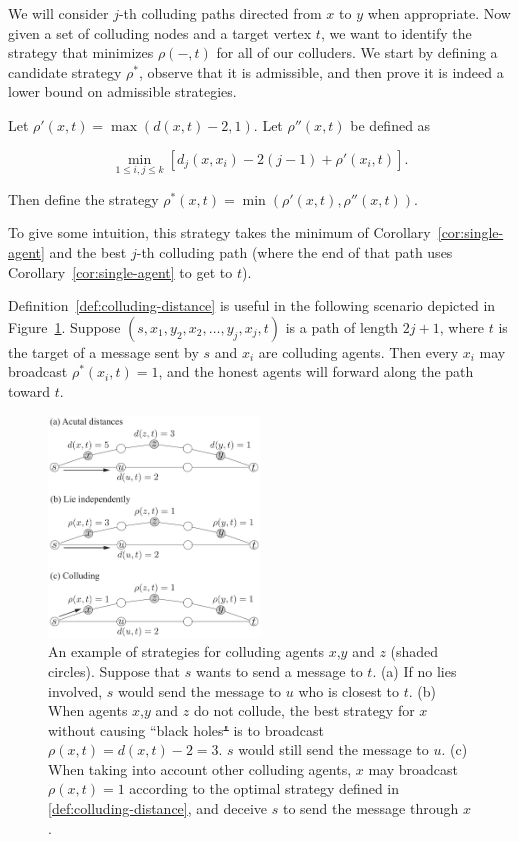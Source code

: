 \documentclass{comnet}
\providecommand{\DIFadd}[1]{{\protect\color{blue}\uwave{#1}}} %
\providecommand{\DIFdel}[1]{{\protect\color{red}\sout{#1}}}                      %
\providecommand{\DIFaddFL}[1]{\DIFadd{#1}} %
\providecommand{\DIFdelFL}[1]{\DIFdel{#1}} %
\providecommand{\DIFaddbeginFL}{} %
\providecommand{\DIFaddendFL}{} %
\providecommand{\DIFdelbeginFL}{} %
\providecommand{\DIFdelendFL}{} %
\begin{document}
We will consider $j$-th colluding paths directed from $x$ to $y$ when
appropriate. Now given a set of colluding nodes and a target vertex $t$, we
want to identify the strategy that minimizes $\rho(-,t)$ for all of our
colluders. We start by defining a candidate strategy $\rho^*$, observe that it
is admissible, and then prove it is indeed a lower bound on admissible
strategies.

\begin{definition} \label{def:colluding-distance}
Let $\rho'(x,t) = \max(d(x,t) - 2, 1)$. Let $\rho''(x, t)$ be defined as

\[
   \min_{1 \leq i,j \leq k} \left [ d_j(x,x_i)-2(j-1) + \rho'(x_i, t) \right ].
\]

Then define the strategy $\rho^*(x,t)=\min(\rho'(x,t), \rho''(x, t))$.

\end{definition}

To give some intuition, this strategy takes the minimum of
Corollary~\ref{cor:single-agent} and the best $j$-th colluding path (where the
end of that path uses Corollary~\ref{cor:single-agent} to get to $t$).

Definition~\ref{def:colluding-distance} is useful in the following scenario
depicted in Figure~\ref{fig:colluding-distance}. Suppose $(s, x_1, y_2, x_2,
\dots, y_j, x_j, t)$ is a path of length $2j + 1$, where $t$ is the target of a
message sent by $s$ and $x_i$ are colluding agents.  Then every $x_i$ may
broadcast $\rho^*(x_i, t) = 1$, and 
the honest agents will forward along the path toward $t$.

\begin{figure}[thb]
\centering
\includegraphics[width=0.5\textwidth]{images/strategy.pdf}
\caption{An example of strategies for colluding agents $x$,$y$ and $z$ (shaded
circles). Suppose that $s$ wants to send a message to $t$. (a) If no lies
involved, $s$ would send the message to $u$ who is closest to $t$. (b) When
agents $x$,$y$ and $z$ do not collude, the best strategy for $x$ without
causing ``black holes\DIFdelbeginFL \DIFdelFL{" }\DIFdelendFL \DIFaddbeginFL \DIFaddFL{'' }\DIFaddendFL is to broadcast $\rho(x,t) = d(x,t) - 2=3$. $s$ would
still send the message to $u$. (c) When taking into account other colluding
agents, $x$ may broadcast $\rho(x,t) = 1$ according to the optimal strategy
defined in \ref{def:colluding-distance}, and deceive $s$ to send the message
through $x$.  } \label{fig:colluding-distance}
\end{figure}
\end{document}
